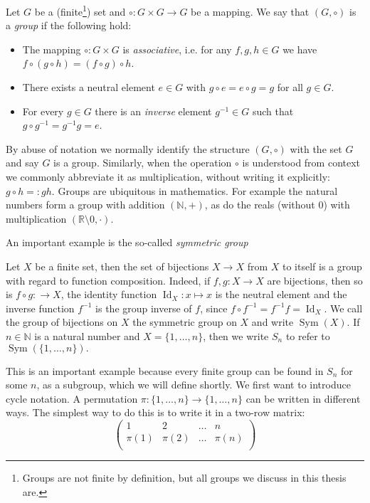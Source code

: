 \begin{defn}
 Let $G$ be a (finite\footnote{Groups are not finite by definition, but all groups we discuss in this thesis are.}) set and $ \circ : G \times G \rightarrow G$ be a mapping. 
We say that $(G, \circ)$ is a \emph{group} if the following hold:
\begin{itemize}
\item The mapping $\circ : G \times G$ is \emph{associative}, i.e. for any $f,g,h \in G$ we have $f \circ (g \circ h) = (f \circ g) \circ h$.
\item There exists a neutral element $e \in G$ with $g \circ e = e \circ g = g$ for all $g \in G$.
\item For every $g \in G$ there is an \emph{inverse} element $g^{-1} \in G$ such that $g \circ g^{-1} = g^{-1} g = e$.
\end{itemize}
\end{defn}
By abuse of notation we normally identify the structure $(G,\circ)$ with the set $G$ and say $G$ is a group.
Similarly, when the operation $\circ$ is understood from context we commonly abbreviate it as multiplication, without writing it explicitly: $g \circ h =: gh$.
Groups are ubiquitous in mathematics. For example the natural numbers form a group with addition $(\mathbb{N},+)$, as do the reals (without 0) with multiplication $(\mathbb{R}\setminus{0},\cdot)$.

An important example is the so-called \emph{symmetric group}
\begin{ex}
Let $X$ be a finite set, then the set of bijections $X \rightarrow X$ from $X$ to itself is a group with regard to function composition.
Indeed, if $f,g : X \rightarrow X$ are bijections, then so is $f \circ g :  \rightarrow X$, the identity function $\operatorname{Id}_X : x \mapsto x$ is the neutral element and the inverse function $f^{-1}$ is the group inverse of $f$,
since $f \circ f^{-1} = f^{-1} f = \operatorname{Id}_X.$ We call the group of bijections on $X$ the symmetric group on $X$ and write $\operatorname{Sym}(X)$.
If $n \in \mathbb{N}$ is a natural number and $X = \{ 1 ,\ldots, n \}$, then we write $S_n$ to refer to $\operatorname{Sym}(\{1,\ldots,n\}).$
\end{ex}
This is an important example because every finite group can be found in $S_n$ for some $n$, as a subgroup, which we will define shortly.
We first want to introduce cycle notation. A permutation $\pi : \{ 1, \ldots, n \} \rightarrow \{ 1 , \ldots, n \}$ can be written in different ways.
The simplest way to do this is to write it in a two-row matrix:
\begin{equation*}
\left(
\begin{array}{llll}
1 & 2 & \ldots & n \\
\pi(1) & \pi(2) & \ldots & \pi(n) \\
\end{array}
\right)
\end{equation*}


